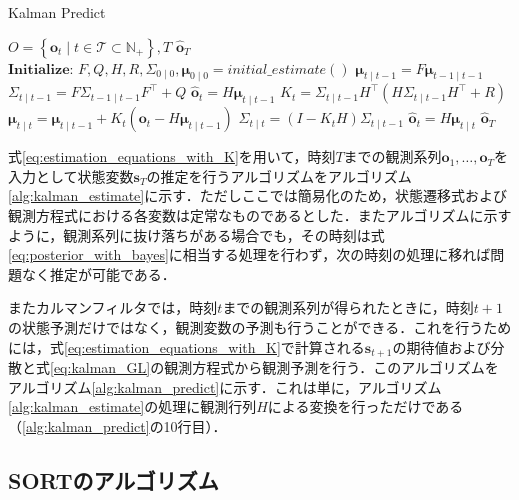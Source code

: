         \begin{algorithm}[t]
            \caption[Kalman Predict]{Kalman Predict}
            \label{alg:kalman_predict}
            \begin{algorithmic}[1]
                \Require $O = \left\{\bm{o}_t \mid t \in \mathcal{T} \subset \mathbb{N}_+\right\}, T$
                \Ensure $\hat{\bm{o}}_T$
                \State $\textbf{Initialize: } F, Q, H, R, \Sigma_{0 \mid 0}, \bm{\mu}_{0 \mid 0} = initial\_estimate()$
                    \State $\bm{\mu}_{t \mid t-1} = F \bm{\mu}_{t-1 \mid t-1}$
                    \State $\Sigma_{t \mid t-1} = F \Sigma_{t-1 \mid t-1} F^{\top} + Q$
                    \State $\hat{\bm{o}}_t = H \bm{\mu}_{t \mid t-1}$
                        \State $K_t = \Sigma_{t \mid t-1} H^{\top} \left( H \Sigma_{t \mid t-1} H^{\top} + R\right)$
                        \State $\bm{\mu}_{t \mid t} = \bm{\mu}_{t \mid t-1} + K_t \left( \bm{o}_t - H \bm{\mu}_{t \mid t-1} \right)$
                        \State $\Sigma_{t \mid t} = \left( I - K_t H \right) \Sigma_{t \mid t-1}$
                        \State $\hat{\bm{o}}_t = H \bm{\mu}_{t \mid t}$
                    \EndIf
                \EndFor
                \State \Return $\hat{\bm{o}}_T$
            \end{algorithmic}
        \end{algorithm}

        式\ref{eq:estimation_equations_with_K}を用いて，時刻$T$までの観測系列$\bm{o}_1, \dots, \bm{o}_T$を入力として状態変数$\bm{s}_T$の推定を行うアルゴリズムをアルゴリズム\ref{alg:kalman_estimate}に示す．ただしここでは簡易化のため，状態遷移式および観測方程式における各変数は定常なものであるとした．またアルゴリズムに示すように，観測系列に抜け落ちがある場合でも，その時刻は式\ref{eq:posterior_with_bayes}に相当する処理を行わず，次の時刻の処理に移れば問題なく推定が可能である．

        またカルマンフィルタでは，時刻$t$までの観測系列が得られたときに，時刻$t+1$の状態予測だけではなく，観測変数の予測も行うことができる．これを行うためには，式\ref{eq:estimation_equations_with_K}で計算される$\bm{s}_{t+1}$の期待値および分散と式\ref{eq:kalman_GL}の観測方程式から観測予測を行う．このアルゴリズムをアルゴリズム\ref{alg:kalman_predict}に示す．これは単に，アルゴリズム\ref{alg:kalman_estimate}の処理に観測行列$H$による変換を行っただけである（\ref{alg:kalman_predict}の10行目）．

    \subsection{SORTのアルゴリズム}
    \label{subsec:sort_algorithm}

